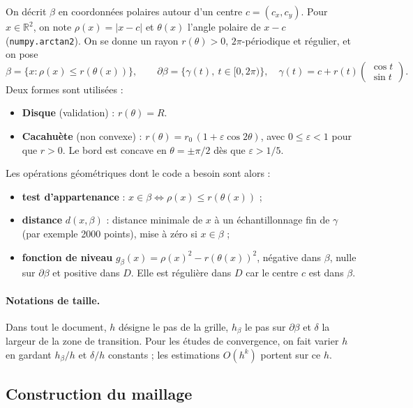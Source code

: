 \documentclass[11pt,a4paper]{article}
\begin{document}
On décrit $\beta$ en coordonnées polaires autour d'un centre
$c = (c_x, c_y)$. Pour $x \in \mathbb{R}^2$, on note
$\rho(x) = |x - c|$ et $\theta(x)$ l'angle polaire de $x - c$
(\texttt{numpy.arctan2}). On se donne un rayon $r(\theta) > 0$,
$2\pi$-périodique et régulier, et on pose
\[
\beta = \{ x : \rho(x) \le r(\theta(x)) \},
\qquad
\partial\beta = \{ \gamma(t),\ t \in [0, 2\pi) \},
\quad
\gamma(t) = c + r(t) \begin{pmatrix} \cos t \\ \sin t \end{pmatrix}.
\]
Deux formes sont utilisées :
\begin{itemize}
  \item \textbf{Disque} (validation) : $r(\theta) = R$.
  \item \textbf{Cacahuète} (non convexe) :
        $r(\theta) = r_0\,(1 + \varepsilon \cos 2\theta)$, avec
        $0 \le \varepsilon < 1$ pour que $r > 0$. Le bord est concave en
        $\theta = \pm\pi/2$ dès que $\varepsilon > 1/5$.
\end{itemize}
Les opérations géométriques dont le code a besoin sont alors :
\begin{itemize}
  \item \textbf{test d'appartenance} : $x \in \beta \iff \rho(x) \le r(\theta(x))$ ;
  \item \textbf{distance} $d(x, \beta)$ : distance minimale de $x$ à un
        échantillonnage fin de $\gamma$ (par exemple 2000 points), mise à
        zéro si $x \in \beta$ ;
  \item \textbf{fonction de niveau} $g_\beta(x) = \rho(x)^2 - r(\theta(x))^2$,
        négative dans $\beta$, nulle sur $\partial\beta$ et positive dans
        $D$. Elle est régulière dans $D$ car le centre $c$ est dans $\beta$.
\end{itemize}

\paragraph{Notations de taille.} Dans tout le document, $h$ désigne le pas
de la grille, $h_\beta$ le pas sur $\partial\beta$ et $\delta$ la largeur de
la zone de transition. Pour les études de convergence, on fait varier $h$ en
gardant $h_\beta / h$ et $\delta / h$ constants ; les estimations
$O(h^k)$ portent sur ce $h$.

\subsection{Construction du maillage}
\label{sec:construction}
\end{document}
